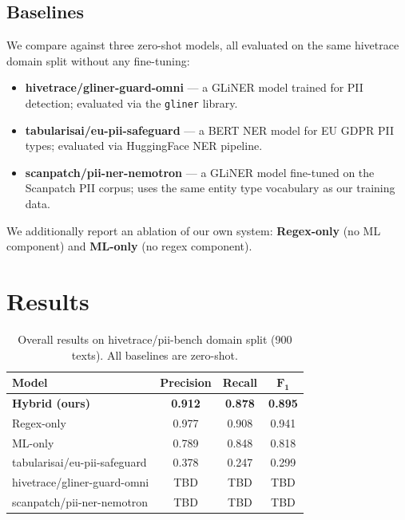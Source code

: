 \documentclass{article}
\begin{document}
\subsection{Baselines}

We compare against three zero-shot models, all evaluated on the same hivetrace domain split without any fine-tuning:

\begin{itemize}
    \item \textbf{hivetrace/gliner-guard-omni} --- a GLiNER model trained for PII detection; evaluated via the \texttt{gliner} library.
    \item \textbf{tabularisai/eu-pii-safeguard} --- a BERT NER model for EU GDPR PII types; evaluated via HuggingFace NER pipeline.
    \item \textbf{scanpatch/pii-ner-nemotron} --- a GLiNER model fine-tuned on the Scanpatch PII corpus; uses the same entity type vocabulary as our training data.
\end{itemize}

We additionally report an ablation of our own system: \textbf{Regex-only} (no ML component) and \textbf{ML-only} (no regex component).

\section{Results}

\begin{table}[tbh!]
\begin{center}
\begin{tabular}[t]{|l|ccc|}
\hline
\textbf{Model} & \textbf{Precision} & \textbf{Recall} & $\mathbf{F_1}$ \\
\hline
\textbf{Hybrid (ours)} & \textbf{0.912} & \textbf{0.878} & \textbf{0.895} \\
Regex-only & 0.977 & 0.908 & 0.941 \\
ML-only & 0.789 & 0.848 & 0.818 \\
\hline
tabularisai/eu-pii-safeguard & 0.378 & 0.247 & 0.299 \\
hivetrace/gliner-guard-omni & TBD & TBD & TBD \\
scanpatch/pii-ner-nemotron & TBD & TBD & TBD \\
\hline
\end{tabular}
\caption{Overall results on hivetrace/pii-bench domain split (900 texts). All baselines are zero-shot.}
\label{tab:results}
\end{center}
\end{table}
\end{document}

